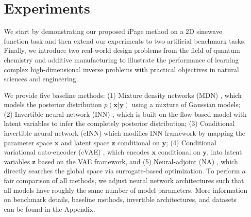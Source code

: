\documentclass[letterpaper]{article} %
\begin{document}
\section{Experiments}
We start by demonstrating our proposed iPage method on a 2D sinewave function task and then extend our experiments to two artificial benchmark tasks. Finally, we introduce two real-world design problems from the field of quantum chemistry and additive manufacturing to illustrate the performance of learning complex high-dimensional inverse problems with practical objectives in natural sciences and engineering. 

\vspace{0.2cm}
 We provide five baseline methods: (1) Mixture density networks (MDN) \citep{bishop1994mixture}, which models the posterior distribution $p(\mathbf{x}|\mathbf{y})$ using a mixture of Gaussian models; (2) Invertible neural network (INN) \citep{ardizzone2018analyzing}, which is built on the flow-based model with latent variables to infer the completely posterior distribution; (3) Conditional invertible neural network (cINN) \citep{ardizzone2019guided, rombach2020network} which modifies INN framework by mapping the parameter space $\mathbf{x}$ and latent space $\mathbf{z}$ conditional on $\mathbf{y}$; (4) Conditional variational auto-encoder (cVAE) \citep{sohn2015learning}, which encodes $\mathbf{x}$ conditional on $\mathbf{y}$, into latent variables $\mathbf{z}$ based on the VAE framework, and (5) Neural-adjoint (NA) \cite{ren2020benchmarking}, which directly searches the global space
via surrogate-based optimization. To perform a fair comparison of all methods, we adjust neural network architectures such that all models have roughly the same number of model parameters. More information on benchmark details, baseline methods, invertible architectures, and datasets can be found in the Appendix.
\end{document}
